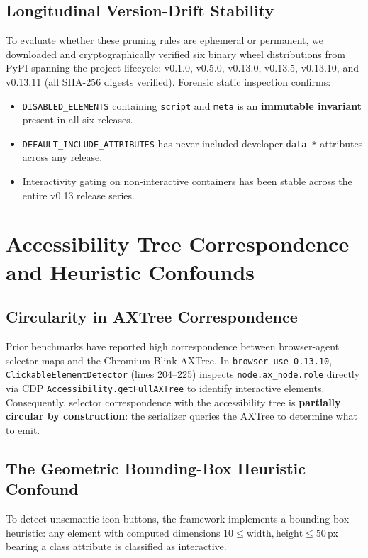 \documentclass[conference]{IEEEtran}
\begin{document}
\subsection{Longitudinal Version-Drift Stability}
To evaluate whether these pruning rules are ephemeral or permanent, we downloaded and cryptographically verified six binary wheel distributions from PyPI spanning the project lifecycle: v0.1.0, v0.5.0, v0.13.0, v0.13.5, v0.13.10, and v0.13.11 (all SHA-256 digests verified). Forensic static inspection confirms:
\begin{itemize}
    \item \texttt{DISABLED\_ELEMENTS} containing \texttt{script} and \texttt{meta} is an \textbf{immutable invariant} present in all six releases.
    \item \texttt{DEFAULT\_INCLUDE\_ATTRIBUTES} has never included developer \texttt{data-*} attributes across any release.
    \item Interactivity gating on non-interactive containers has been stable across the entire v0.13 release series.
\end{itemize}

\section{Accessibility Tree Correspondence and Heuristic Confounds}
\label{sec:correspondence}

\subsection{Circularity in AXTree Correspondence}
Prior benchmarks have reported high correspondence between browser-agent selector maps and the Chromium Blink AXTree. In \texttt{browser-use 0.13.10}, \texttt{ClickableElementDetector} (lines 204--225) inspects \texttt{node.ax\_node.role} directly via CDP \texttt{Accessibility.getFullAXTree} to identify interactive elements. Consequently, selector correspondence with the accessibility tree is \textbf{partially circular by construction}: the serializer queries the AXTree to determine what to emit.

\subsection{The Geometric Bounding-Box Heuristic Confound}
To detect unsemantic icon buttons, the framework implements a bounding-box heuristic: any element with computed dimensions $10 \le \text{width}, \text{height} \le 50$\,px bearing a class attribute is classified as interactive. 
\end{document}
